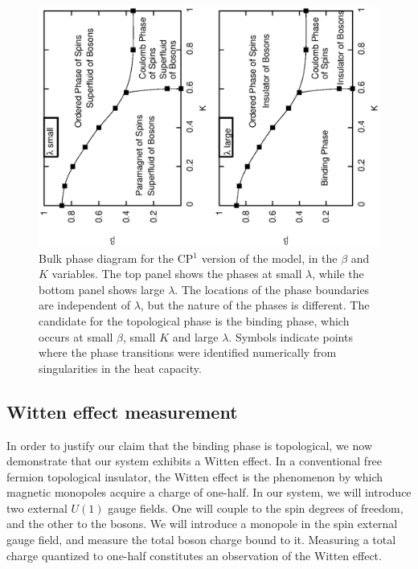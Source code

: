 \documentclass[prb,twocolumn]{revtex4-1}
\begin{document}
\begin{figure}
\includegraphics[angle=-90,width=0.9\linewidth]{figures/cp1bulkphase.eps}
\caption{Bulk phase diagram for the CP$^1$ version of the model, in the $\beta$ and $K$ variables. The top panel shows the phases at small $\lambda$, while the bottom panel shows large $\lambda$. The locations of the phase boundaries are independent of $\lambda$, but the nature of the phases is different. The candidate for the topological phase is the binding phase, which occurs at small $\beta$, small $K$ and large $\lambda$. Symbols indicate points where the phase transitions were identified numerically from singularities in the heat capacity.}
\label{cp1bulkphase}
\end{figure}

\subsection{Witten effect measurement}
In order to justify our claim that the binding phase is topological, we now demonstrate that our system exhibits a Witten effect. In a conventional free fermion topological insulator, the Witten effect is the phenomenon by which magnetic monopoles acquire a charge of one-half. In our system, we will introduce two external $U(1)$ gauge fields. One will couple to the spin degrees of freedom, and the other to the bosons. We will introduce a monopole in the spin external gauge field, and measure the total boson charge bound to it. Measuring a total charge quantized to one-half constitutes an observation of the Witten effect. 
\end{document}
